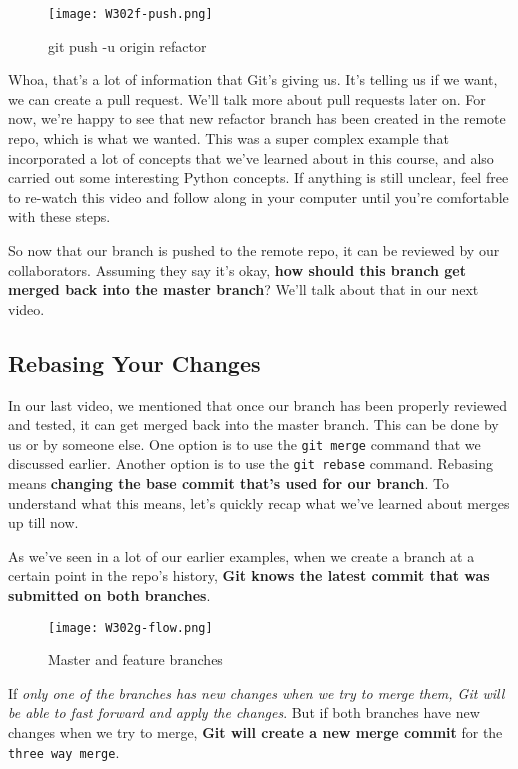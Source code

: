 	\begin{figure} 
	 	\caption{git push -u origin refactor}
	 	\centering
	 	\texttt{[image: W302f-push.png]}
		\label{W302f-push}
	\end{figure}
	
	Whoa, that's a lot of information that Git's giving us. It's telling us if we want, we can create a pull request. We'll talk more about pull requests later on. For now, we're happy to see that new refactor branch has been created in the remote repo, which is what we wanted. This was a super complex example that incorporated a lot of concepts that we've learned about in this course, and also carried out some interesting Python concepts. If anything is still unclear, feel free to re-watch this video and follow along in your computer until you're comfortable with these steps. 
	
	So now that our branch is pushed to the remote repo, it can be reviewed by our collaborators. Assuming they say it's okay, \textbf{how should this branch get merged back into the master branch}? We'll talk about that in our next video.


	\subsection{Rebasing Your Changes} \label{W303c}

	In our last video, we mentioned that once our branch has been properly reviewed and tested, it can get merged back into the master branch. This can be done by us or by someone else. One option is to use the \verb|git merge| command that we discussed earlier. Another option is to use the \verb|git rebase| command. Rebasing means \textbf{changing the base commit that's used for our branch}. To understand what this means, let's quickly recap what we've learned about merges up till now. 
	
	As we've seen in a lot of our earlier examples, when we create a branch at a certain point in the repo's history, \textbf{Git knows the latest commit that was submitted on both branches}. 
	
	\begin{figure} 
		\caption{Master and feature branches}
		\centering
		\texttt{[image: W302g-flow.png]}
		\label{W302g-flow}
	\end{figure}
	
	If \textit{only one of the branches has new changes when we try to merge them, Git will be able to fast forward and apply the changes}. But if both branches have new changes when we try to merge, \textbf{Git will create a new merge commit} for the \verb|three way merge|.
	
